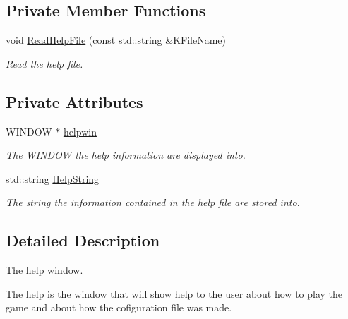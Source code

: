 \subsection*{Private Member Functions}
\begin{DoxyCompactItemize}
\item 
void \hyperlink{class_c_help_a3b274aa242a0419df9193b4bcfe798c5}{Read\-Help\-File} (const std\-::string \&K\-File\-Name)
\begin{DoxyCompactList}\small\item\em Read the help file. \end{DoxyCompactList}\end{DoxyCompactItemize}
\subsection*{Private Attributes}
\begin{DoxyCompactItemize}
\item 
\hypertarget{class_c_help_a5bb48ef48b69605b984ec9ce3d6cda21}{W\-I\-N\-D\-O\-W $\ast$ \hyperlink{class_c_help_a5bb48ef48b69605b984ec9ce3d6cda21}{helpwin}}\label{class_c_help_a5bb48ef48b69605b984ec9ce3d6cda21}

\begin{DoxyCompactList}\small\item\em The W\-I\-N\-D\-O\-W the help information are displayed into. \end{DoxyCompactList}\item 
\hypertarget{class_c_help_a0067c2eda03c1765d048bc6005a7b7eb}{std\-::string \hyperlink{class_c_help_a0067c2eda03c1765d048bc6005a7b7eb}{Help\-String}}\label{class_c_help_a0067c2eda03c1765d048bc6005a7b7eb}

\begin{DoxyCompactList}\small\item\em The string the information contained in the help file are stored into. \end{DoxyCompactList}\end{DoxyCompactItemize}


\subsection{Detailed Description}
The help window. 

The help is the window that will show help to the user about how to play the game and about how the cofiguration file was made. 

